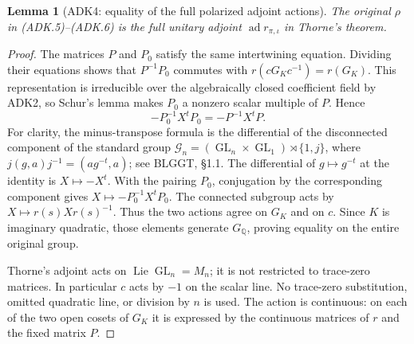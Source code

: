\documentclass[11pt,a4paper]{article}
\numberwithin{equation}{section}
\newtheorem{lemma}[theorem]{Lemma}
\theoremstyle{remark}\newtheorem{remark}[theorem]{Remark}
\begin{document}
\begin{lemma}[ADK4: equality of the full polarized adjoint actions]
\label{claim:ADK4}
The original $\rho$ in (ADK.5)--(ADK.6) is the full unitary adjoint
$\operatorname{ad}r_{\pi,\iota}$ in Thorne's theorem.
\end{lemma}
\begin{proof}
The matrices $P$ and $P_0$ satisfy the same intertwining equation.
Dividing their equations shows that $P^{-1}P_0$ commutes with
$r(cG_Kc^{-1})=r(G_K)$.  This representation is irreducible over
the algebraically closed coefficient field by ADK2, so Schur's lemma
makes $P_0$ a nonzero scalar multiple of $P$.  Hence
\[
              -P_0^{-1}X^tP_0=-P^{-1}X^tP.
 \tag{ADK.8}
\]
For clarity, the minus-transpose formula is the differential of the
disconnected component of the standard group
$\mathcal G_n=(\operatorname{GL}_n\times\operatorname{GL}_1)
\rtimes\{1,\allowbreak{} j\}$, where
$j(g,\allowbreak{} a)j^{-1}=(a g^{-t},\allowbreak{} a)$; see BLGGT, \S1.1.
The differential of $g\mapsto g^{-t}$ at the identity is
$X\mapsto-X^t$.  With the pairing $P_0$, conjugation by the
corresponding component gives $X\mapsto-P_0^{-1}X^tP_0$.
The connected subgroup acts by $X\mapsto r(s)Xr(s)^{-1}$.
Thus the two actions agree on $G_K$ and on $c$.  Since $K$ is
imaginary quadratic, those elements generate $G_{\mathbb Q}$,
proving equality on the entire original group.

Thorne's adjoint acts on $\operatorname{Lie}\operatorname{GL}_n=M_n$;
it is not restricted to trace-zero matrices.  In particular $c$
acts by $-1$ on the scalar line.  No trace-zero substitution, omitted
quadratic line, or division by $n$ is used.  The action is continuous:
on each of the two open cosets of $G_K$ it is expressed by the
continuous matrices of $r$ and the fixed matrix $P$.
\end{proof}
\end{document}
